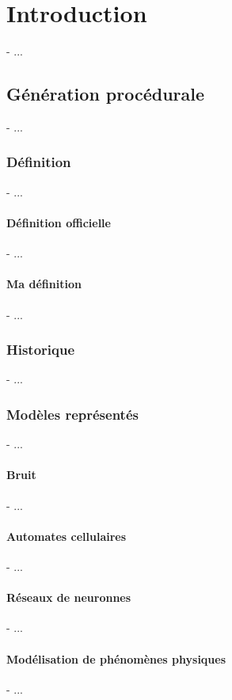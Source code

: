\chapter{Introduction}
\minitoc

- ...

\section{Génération procédurale}
- ...

\subsection{Définition}
- ...

\subsubsection{Définition officielle}
- ...

\subsubsection{Ma définition}
- ...

\subsection{Historique}
- ...

\subsection{Modèles représentés}
- ...

\subsubsection{Bruit}
- ...

\subsubsection{Automates cellulaires}
- ...

\subsubsection{Réseaux de neuronnes}
- ...

\subsubsection{Modélisation de phénomènes physiques}
- ...

